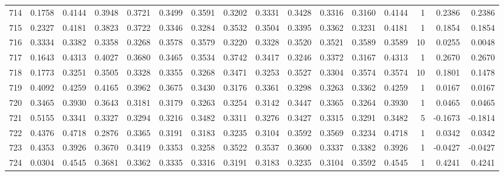 \begin{tabular}{lrrrrrrrrrrrrrrr}
714 &      0.1758 &  0.4144 &  0.3948 &  0.3721 &  0.3499 &  0.3591 &  0.3202 &  0.3331 &  0.3428 &  0.3316 &   0.3160 &     0.4144 &      1 &                    0.2386 &                     0.2386 \\
715 &      0.2327 &  0.4181 &  0.3823 &  0.3722 &  0.3346 &  0.3284 &  0.3532 &  0.3504 &  0.3395 &  0.3362 &   0.3231 &     0.4181 &      1 &                    0.1854 &                     0.1854 \\
716 &      0.3334 &  0.3382 &  0.3358 &  0.3268 &  0.3578 &  0.3579 &  0.3220 &  0.3328 &  0.3520 &  0.3521 &   0.3589 &     0.3589 &     10 &                    0.0255 &                     0.0048 \\
717 &      0.1643 &  0.4313 &  0.4027 &  0.3680 &  0.3465 &  0.3534 &  0.3742 &  0.3417 &  0.3246 &  0.3372 &   0.3167 &     0.4313 &      1 &                    0.2670 &                     0.2670 \\
718 &      0.1773 &  0.3251 &  0.3505 &  0.3328 &  0.3355 &  0.3268 &  0.3471 &  0.3253 &  0.3527 &  0.3304 &   0.3574 &     0.3574 &     10 &                    0.1801 &                     0.1478 \\
719 &      0.4092 &  0.4259 &  0.4165 &  0.3962 &  0.3675 &  0.3430 &  0.3176 &  0.3361 &  0.3298 &  0.3263 &   0.3362 &     0.4259 &      1 &                    0.0167 &                     0.0167 \\
720 &      0.3465 &  0.3930 &  0.3643 &  0.3181 &  0.3179 &  0.3263 &  0.3254 &  0.3142 &  0.3447 &  0.3365 &   0.3264 &     0.3930 &      1 &                    0.0465 &                     0.0465 \\
721 &      0.5155 &  0.3341 &  0.3327 &  0.3294 &  0.3216 &  0.3482 &  0.3311 &  0.3276 &  0.3427 &  0.3315 &   0.3291 &     0.3482 &      5 &                   -0.1673 &                    -0.1814 \\
722 &      0.4376 &  0.4718 &  0.2876 &  0.3365 &  0.3191 &  0.3183 &  0.3235 &  0.3104 &  0.3592 &  0.3569 &   0.3234 &     0.4718 &      1 &                    0.0342 &                     0.0342 \\
723 &      0.4353 &  0.3926 &  0.3670 &  0.3419 &  0.3353 &  0.3258 &  0.3522 &  0.3537 &  0.3600 &  0.3337 &   0.3382 &     0.3926 &      1 &                   -0.0427 &                    -0.0427 \\
724 &      0.0304 &  0.4545 &  0.3681 &  0.3362 &  0.3335 &  0.3316 &  0.3191 &  0.3183 &  0.3235 &  0.3104 &   0.3592 &     0.4545 &      1 &                    0.4241 &                     0.4241 \\

\end{tabular}

